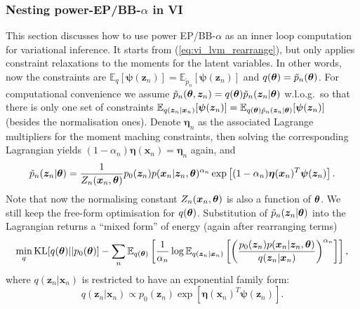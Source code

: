 \subsubsection{Nesting power-EP/BB-$\alpha$ in VI}
\label{sec:vi_pep}
This section discusses how to use power EP/BB-$\alpha$ as an inner loop computation for variational inference. It starts from (\ref{eq:vi_lvm_rearrange}), but only applies constraint relaxations to the moments for the latent variables. In other words, now the constraints are $\mathbb{E}_{q}[\bm{\psi}(\bm{z}_n)] = \mathbb{E}_{\tilde{p}_n}[\bm{\psi}(\bm{z}_n)]$ and $q(\bm{\theta}) = \tilde{p}_n(\bm{\theta})$. For computational convenience we assume $\tilde{p}_n(\bm{\theta}, \bm{z}_n) = q(\bm{\theta}) \tilde{p}_n(\bm{z}_n|\bm{\theta})$ w.l.o.g.~so that there is only one set of constraints $\mathbb{E}_{q(\bm{z}_n|\bm{x}_n)}[\bm{\psi}(\bm{z}_n)] = \mathbb{E}_{q(\bm{\theta}) \tilde{p}_n(\bm{z}_n|\bm{\theta})}[\bm{\psi}(\bm{z}_n)]$ (besides the normalisation ones). Denote $\bm{\eta}_n$ as the associated Lagrange multipliers for the moment maching constraints, then solving the corresponding Lagrangian yields $(1 - \alpha_n) \bm{\eta}(\bm{x}_n) = \bm{\eta}_n$ again, and 
\begin{equation}
 \tilde{p}_n(\bm{z}_n|\bm{\theta}) = \frac{1}{Z_n(\bm{x}_n, \bm{\theta})} p_0(\bm{z}_n) p(\bm{x}_n|\bm{z}_n, \bm{\theta})^{\alpha_n} \exp \left[ (1 - \alpha_n) \bm{\eta}(\bm{x}_n)^T \bm{\psi}(\bm{z}_n) \right].
\end{equation}
Note that now the normalising constant $Z_n(\bm{x}_n, \bm{\theta})$ is also a function of $\bm{\theta}$. We still keep the free-form optimisation for $q(\bm{\theta})$. Substitution of $\tilde{p}_n(\bm{z}_n|\bm{\theta})$ into the Lagrangian returns a ``mixed form'' of energy (again after rearranging terms)
\begin{equation}
 \min_{q} \mathrm{KL}[q(\bm{\theta}) || p_0(\bm{\theta})] - \sum_n \mathbb{E}_{q(\bm{\theta})} \left[ \frac{1}{\alpha_n} \log \mathbb{E}_{q(\bm{z}_n|\bm{x}_n)} \left[ \left( \frac{p_0(\bm{z}_n) p(\bm{x}_n|\bm{z}_n, \bm{\theta})}{q(\bm{z}_n|\bm{x}_n)} \right)^{\alpha_n} \right] \right],
\end{equation}
where $q(\bm{z}_n|\bm{x}_n)$ is restricted to have an exponential family form: 
$$q(\bm{z}_n|\bm{x}_n) \propto p_0(\bm{z}_n) \exp \left[ \bm{\eta}(\bm{x}_n)^T \bm{\psi}(\bm{z}_n) \right].$$ 

